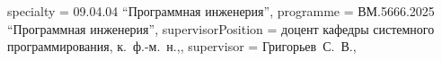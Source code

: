 {    %
    specialty          = {09.04.04 \enquote{Программная инженерия}},
    programme          = {ВМ.5666.2025 \enquote{Программная инженерия}},
    supervisorPosition = {доцент кафедры системного программирования, к.~ф.-м.~н.,},
    supervisor         = {Григорьев~С.~В.},
}
